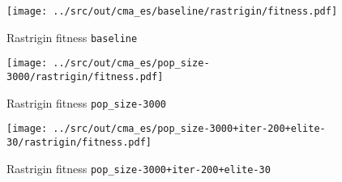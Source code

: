 \begin{figure}[H]
	\centering
	\begin{minipage}[b]{.6\textwidth}
		\texttt{[image: ../src/out/cma\_es/baseline/rastrigin/fitness.pdf]}	
	\end{minipage}
	\caption{Rastrigin fitness \texttt{baseline}}
	\label{fig:cmaes-r-fitness/baseline}

	\begin{minipage}[b]{.6\textwidth}
		\texttt{[image: ../src/out/cma\_es/pop\_size-3000/rastrigin/fitness.pdf]}	
	\end{minipage}
	\caption{Rastrigin fitness \texttt{pop\_size-3000}}
	\label{fig:cmaes-r-fitness/3000}
	
		\begin{minipage}[b]{.6\textwidth}
		\texttt{[image: ../src/out/cma\_es/pop\_size-3000+iter-200+elite-30/rastrigin/fitness.pdf]}	
	\end{minipage}
	\caption{Rastrigin fitness \texttt{pop\_size-3000+iter-200+elite-30}}
	\label{fig:cmaes-r-fitness/3000iter}
\end{figure}

